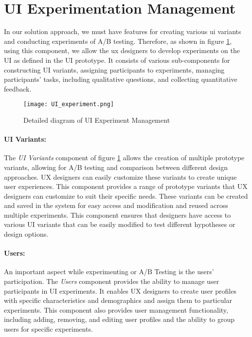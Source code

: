 \clearpage
\section{UI Experimentation Management}
\label{sc:section:experimentation}
In our solution approach, we must have features for creating various \ac{ui} variants and conducting experiments of A/B testing. 
Therefore, as shown in figure \ref{fig:sc:experiments}, using this component, we allow the \ac{ux} designers to develop experiments on the UI as defined in the UI prototype.
It consists of various sub-components for constructing UI variants, assigning participants to experiments, managing participants' tasks, including qualitative questions, and collecting quantitative feedback.

\begin{figure}[htbp!]
    \centering    
    \texttt{[image: UI\_experiment.png]} 
    \caption[Details of UI Experiment Management]{Detailed diagram of UI Experiment Management}
    \label{fig:sc:experiments}
\end{figure}

\paragraph{UI Variants:}
The \textit{UI Variants} component of figure \ref{fig:sc:experiments} allows the creation of multiple prototype variants, allowing for A/B testing and comparison between different design approaches. 
UX designers can easily customize these variants to create unique user experiences.
This component provides a range of prototype variants that UX designers can customize to suit their specific needs. 
These variants can be created and saved in the system for easy access and modification and reused across multiple experiments. 
This component ensures that designers have access to various UI variants that can be easily modified to test different hypotheses or design options.

\paragraph{Users:}
An important aspect while experimenting or A/B Testing is the users' participation. 
The \textit{Users} component provides the ability to manage user participants in UI experiments. 
It enables UX designers to create user profiles with specific characteristics and demographics and assign them to particular experiments. 
This component also provides user management functionality, including adding, removing, and editing user profiles and the ability to group users for specific experiments.

